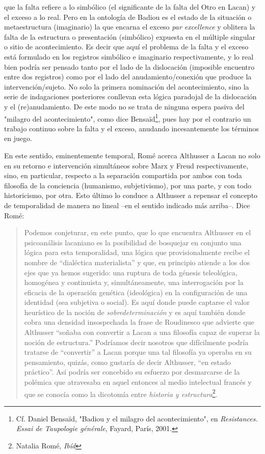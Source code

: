 que la falta refiere a lo simbólico (el significante de la falta del
Otro en Lacan) y el exceso a lo real. Pero en la ontología de Badiou es
el estado de la situación o metaestructura (imaginario) la que encarna
el exceso \emph{par excellence} y oblitera la falta de la estructura o
presentación (simbólico) expuesta en el múltiple singular o sitio de
acontecimiento. Es decir que aquí el problema de la falta y el exceso
está formulado en los registros simbólico e imaginario respectivamente,
y lo real bien podría ser pensado tanto por el lado de la dislocación
(imposible encuentro entre dos registros) como por el lado del
anudamiento/conexión que produce la intervención/sujeto. No solo la
primera nominación del acontecimiento, sino la serie de indagaciones
posteriores conllevan esta lógica paradojal de la dislocación y el
(re)anudamiento. De este modo no se trata de ninguna espera pasiva del
"milagro del acontecimiento", como dice Bensaïd\footnote{Cf. Daniel
  Bensaïd, "Badiou y el milagro del acontecimiento", en
  \emph{Resistances. Essai de Taupologie générale}, Fayard, París, 2001.},
pues hay por el contrario un trabajo continuo sobre la falta y el
exceso, anudando incesantemente los términos en juego.

En este sentido, eminentemente temporal, Romé acerca Althusser a Lacan
no solo en su retorno e intervención simultáneos sobre Marx y Freud
respectivamente, sino, en particular, respecto a la separación
compartida por ambos con toda filosofía de la conciencia (humanismo,
subjetivismo), por una parte, y con todo historicismo, por otra. Esto
último lo conduce a Althusser a repensar el concepto de temporalidad de
manera no lineal --en el sentido indicado más arriba--. Dice Romé:

\begin{quote}
Podemos conjeturar, en este punto, que lo que encuentra Althusser en el
psicoanálisis lacaniano es la posibilidad de bosquejar en conjunto una
lógica para esta temporalidad, una lógica que provisionalmente recibe el
nombre de ``dialéctica materialista'' y que, en principio atiende a los
dos ejes que ya hemos sugerido: una ruptura de toda génesis teleológica,
homogénea y continuista y, simultáneamente, una interrogación por la
eficacia de la operación genética (ideológica) en la configuración de
una identidad (sea subjetiva o social). Es aquí donde puede captarse el
valor heurístico de la noción de \emph{sobredeterminación} y es aquí
también donde cobra una densidad insospechada la frase de Roudinesco que
advierte que Althusser ``soñaba con convertir a Lacan a una filosofía
capaz de superar la noción de estructura.'' Podríamos decir nosotros que
difícilmente podría tratarse de ``convertir'' a Lacan porque una tal
filosofía ya operaba en su pensamiento, quizás, como gustaría de decir
Althusser, ``en estado práctico''. Así podría ser concebido su esfuerzo
por desmarcarse de la polémica que atravesaba en aquel entonces al medio
intelectual francés y que se conocía como la dicotomía entre
\emph{historia y estructura}\footnote{Natalia Romé, \emph{Ibíd}}.
\end{quote}

